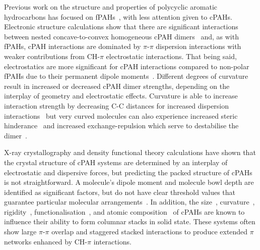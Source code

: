 Previous work on the structure and properties of polycyclic aromatic hydrocarbons has focused on fPAHs~\cite{Grancic2016,chen2014size,Rapacioli2005stacked,hernandez2017dynamics}, with less attention given to cPAHs. Electronic structure calculations show that there are significant interactions between nested concave-to-convex homogeneous cPAH dimers~\cite{sygula2009pi,Cabaleiro-Lago2018} and, as with fPAHs, cPAH interactions are dominated by $\pi$-$\pi$ dispersion interactions with weaker contributions from CH-$\pi$ electrostatic interactions. That being said, electrostatics are more significant for cPAH interactions compared to non-polar fPAHs due to their permanent dipole moments~\cite{Cabaleiro-Lago2018,janowski2011convex}.
Different degrees of curvature result in increased or decreased cPAH dimer strengths, depending on the interplay of geometry and electrostatic effects. Curvature is able to increase interaction strength by decreasing C-C distances for increased dispersion interactions~\cite{kennedy2012buckyplates} but very curved molecules can also experience increased steric hinderance~\cite{sygula2009pi,Martin2018polar} and increased exchange-repulsion which serve to destabilise the dimer~\cite{kennedy2012buckyplates,sygula2009pi}.

X-ray crystallography and density functional theory calculations have shown that the crystal structure of cPAH systems are determined by an interplay of electrostatic and dispersive forces, but predicting the packed structure of cPAHs is not straightforward. A molecule's dipole moment and molecule bowl depth are identified as significant factors, but do not have clear threshold values that guarantee particular molecular arrangements~\cite{Filatov2010}. In addition, the size~\cite{wu2006aromatic,forkey1997crystallographic}, curvature~\cite{petrukhina2004hemibuckminsterfullerene,bronstein2002practical,sakurai2005structural}, rigidity~\cite{sygula1994bowl,wang2015electronic}, functionalisation~\cite{sanyal2014functional}, and atomic composition~\cite{imamura1999triphenyleno} of cPAHs are known to influence their ability to form columnar stacks in solid state. These systems often show large $\pi$-$\pi$ overlap and staggered stacked interactions to produce extended $\pi$ networks enhanced by CH-$\pi$ interactions.

